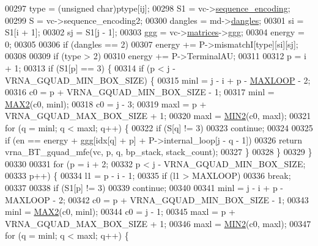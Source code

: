 \begin{DoxyCode}
00297   type    = (\textcolor{keywordtype}{unsigned} char)ptype[ij];
00298   S1      = vc->\hyperlink{group__fold__compound_a9934bdb695d35a3544285cbcc19f9763}{sequence\_encoding};
00299   S       = vc->sequence\_encoding2;
00300   dangles = md->\hyperlink{group__model__details_adcda4ff2ea77748ae0e8700288282efc}{dangles};
00301   si      = S1[i + 1];
00302   sj      = S1[j - 1];
00303   ggg     = vc->\hyperlink{group__fold__compound_aca8be7bdc65bafe2172c6ee777f18568}{matrices}->\hyperlink{group__dp__matrices_a0b7b86a5c75c96eabb89eb53a13e7164}{ggg};
00304   energy  = 0;
00305 
00306   \textcolor{keywordflow}{if} (dangles == 2)
00307     energy += P->mismatchI[type][si][sj];
00308 
00309   \textcolor{keywordflow}{if} (type > 2)
00310     energy += P->TerminalAU;
00311 
00312   p = i + 1;
00313   \textcolor{keywordflow}{if} (S1[p] == 3) \{
00314     \textcolor{keywordflow}{if} (p < j - VRNA\_GQUAD\_MIN\_BOX\_SIZE) \{
00315       minl  = j - i + p - \hyperlink{energy__const_8h_ad1bd6eabac419670ddd3c9ed82145988}{MAXLOOP} - 2;
00316       c0    = p + VRNA\_GQUAD\_MIN\_BOX\_SIZE - 1;
00317       minl  = \hyperlink{group__utils_ga33297b3679c713b0c4d897cd0fe3b122}{MAX2}(c0, minl);
00318       c0    = j - 3;
00319       maxl  = p + VRNA\_GQUAD\_MAX\_BOX\_SIZE + 1;
00320       maxl  = \hyperlink{group__utils_gae0b9cd0ce090bd69b951aa73e8fa4f7d}{MIN2}(c0, maxl);
00321       \textcolor{keywordflow}{for} (q = minl; q < maxl; q++) \{
00322         \textcolor{keywordflow}{if} (S[q] != 3)
00323           \textcolor{keywordflow}{continue};
00324 
00325         \textcolor{keywordflow}{if} (en == energy + ggg[idx[q] + p] + P->internal\_loop[j - q - 1])
00326           \textcolor{keywordflow}{return} vrna\_BT\_gquad\_mfe(vc, p, q, bp\_stack, stack\_count);
00327       \}
00328     \}
00329   \}
00330 
00331   \textcolor{keywordflow}{for} (p = i + 2;
00332        p < j - VRNA\_GQUAD\_MIN\_BOX\_SIZE;
00333        p++) \{
00334     l1 = p - i - 1;
00335     \textcolor{keywordflow}{if} (l1 > MAXLOOP)
00336       \textcolor{keywordflow}{break};
00337 
00338     \textcolor{keywordflow}{if} (S1[p] != 3)
00339       \textcolor{keywordflow}{continue};
00340 
00341     minl  = j - i + p - MAXLOOP - 2;
00342     c0    = p + VRNA\_GQUAD\_MIN\_BOX\_SIZE - 1;
00343     minl  = \hyperlink{group__utils_ga33297b3679c713b0c4d897cd0fe3b122}{MAX2}(c0, minl);
00344     c0    = j - 1;
00345     maxl  = p + VRNA\_GQUAD\_MAX\_BOX\_SIZE + 1;
00346     maxl  = \hyperlink{group__utils_gae0b9cd0ce090bd69b951aa73e8fa4f7d}{MIN2}(c0, maxl);
00347     \textcolor{keywordflow}{for} (q = minl; q < maxl; q++) \{

\end{DoxyCode}
